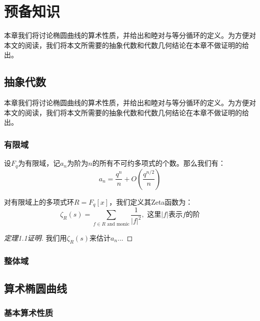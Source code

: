 \documentclass{whuthesis}
\begin{document}

\chapter{预备知识}
本章我们将讨论椭圆曲线的算术性质，并给出和睦对与等分循环的定义。为方便对本文的阅读，我们将本文所需要的抽象代数和代数几何结论在本章不做证明的给出。\par


\section{抽象代数}
本章我们将讨论椭圆曲线的算术性质，并给出和睦对与等分循环的定义。为方便对本文的阅读，我们将本文所需要的抽象代数和代数几何结论在本章不做证明的给出。


\subsection{有限域}

\begin{theorem}[不可约多项式计数]
设$F_q$为有限域，记$a_n$为阶为$n$的所有不可约多项式的个数。那么我们有：
$$a_n=\frac{q^n}{n}+O\left(\frac{q^{n/2}}{n}\right)$$
\end{theorem}

\begin{definition}[Zeta函数]
对有限域上的多项式环$R=F_q[x]$，我们定义其Zeta函数为：
$$\zeta_R(s)=\sum_{f\in R\text{ and monic}}\frac{1}{|f|^2}, \text{ 这里}|f|\text{表示}f\text{的阶}$$
\end{definition}

\begin{proof}[定理1.1证明]
我们用$\zeta_R(s)$来估计$a_n$...
\end{proof}

\subsection{整体域}
\section{算术椭圆曲线}
\subsection{基本算术性质}
\end{document}
